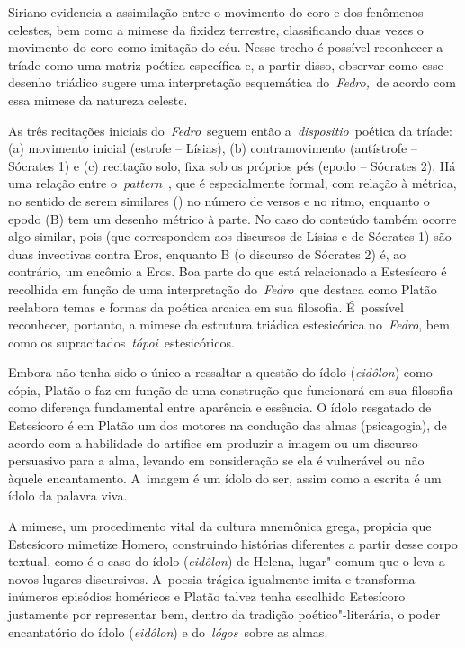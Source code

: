  

Siriano evidencia a assimilação entre o movimento do coro e dos
fenômenos celestes, bem como a mimese da fixidez terrestre,
classificando duas vezes o movimento do coro como imitação do céu. Nesse
trecho é possível reconhecer a tríade como uma matriz poética específica
e, a partir disso, observar como esse desenho triádico sugere uma
interpretação esquemática do~\emph{Fedro,~}de acordo com essa mimese da
natureza celeste.

As três recitações iniciais do~\emph{Fedro}~seguem então
a~\emph{dispositio}~poética da tríade: (a) movimento inicial (estrofe --
Lísias), (b) contramovimento (antístrofe -- Sócrates 1) e (c) recitação
solo, fixa sob os próprios pés (epodo -- Sócrates 2). Há uma relação
entre o~\emph{pattern}~, que é especialmente formal, com relação à
métrica, no sentido de serem similares () no número de versos e no
ritmo, enquanto o epodo (B) tem um desenho métrico à parte. No caso do
conteúdo também ocorre algo similar, pois  (que correspondem aos
discursos de Lísias e de Sócrates 1) são duas invectivas contra Eros,
enquanto B (o discurso de Sócrates 2) é, ao contrário, um encômio a
Eros. Boa parte do que está relacionado a Estesícoro é recolhida em
função de uma interpretação do~\emph{Fedro~}que destaca como Platão
reelabora temas e formas da poética arcaica em sua filosofia. É~possível
reconhecer, portanto, a mimese da estrutura triádica estesicórica
no~\emph{Fedro}, bem como os supracitados~\emph{tópoi}~estesicóricos.

Embora não tenha sido o único a ressaltar a questão do ídolo
(\emph{eidôlon}) como cópia, Platão o faz em função de uma construção
que funcionará em sua filosofia como diferença fundamental entre
aparência e essência. O ídolo resgatado de Estesícoro é em Platão um dos
motores na condução das almas (psicagogia), de acordo com a habilidade
do artífice em produzir a imagem ou um discurso persuasivo para a alma,
levando em consideração se ela é vulnerável ou não àquele encantamento.
A~imagem é um ídolo do ser, assim como a escrita é um ídolo da palavra
viva.

A mimese, um procedimento vital da cultura mnemônica grega, propicia que
Estesícoro mimetize Homero, construindo histórias diferentes a partir
desse corpo textual, como é o caso do ídolo (\emph{eidôlon}) de Helena,
lugar"-comum que o leva a novos lugares discursivos. A~poesia trágica
igualmente imita e transforma inúmeros episódios homéricos e Platão
talvez tenha escolhido Estesícoro justamente por representar bem, dentro
da tradição poético"-literária, o poder encantatório do ídolo
(\emph{eidôlon}) e do~\emph{lógos}~sobre as almas.

